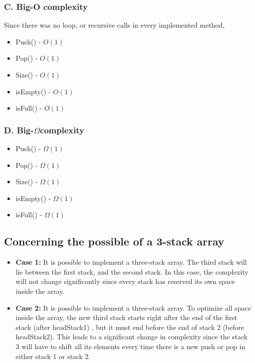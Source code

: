 \documentclass[16pt, letterpaper]{article}
\begin{document}
\subsubsection*{C. Big-O complexity}
Since there was no loop, or recursive calls in every implemented method,
\begin{itemize}
    \item Push() - $O(1)$
    \item Pop() - $O(1)$
    \item Size() - $O(1)$
    \item isEmpty() - $O(1)$
    \item isFull() - $O(1)$
\end{itemize}

\subsubsection*{D. Big-$\Omega$complexity}
\begin{itemize}
    \item Push() - $\Omega(1)$
    \item Pop() - $\Omega(1)$
    \item Size() - $\Omega(1)$
    \item isEmpty() - $\Omega(1)$
    \item isFull() - $\Omega(1)$
\end{itemize}

\subsection{Concerning the possible of a 3-stack array}
\begin{itemize}
    \item \textbf{Case 1:}
    It is possible to implement a three-stack array. The third stack will lie between the first stack, and the second stack. In this case, the complexity will not change significantly since every stack has reserved its own space inside the array.
    \item \textbf{Case 2:}
    It is possible to implement a three-stack array. To optimize all space inside the array, the new third stack starts right after the end of the first stack (after headStack1) , but it must end before the end of stack 2 (before headStack2). This leads to a significant change in complexity since the stack 3 will have to shift all its elements every time there is a new push or pop in either stack 1 or stack 2. 
\end{itemize}
\end{document}
